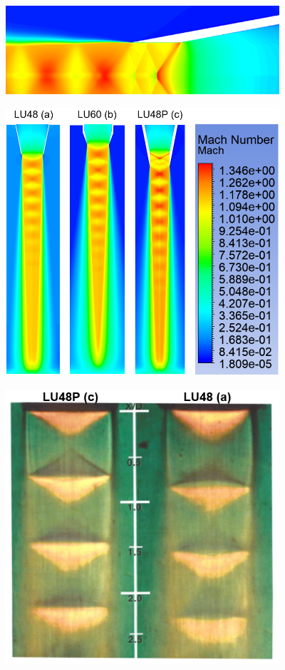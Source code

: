 \documentclass[12pt]{article} %
\begin{document}
\begin{center}
    \includegraphics[width=4in]{Mach_C_Fine.png}
    \label{fig:mach_C}
\end{center}

\begin{center}
    \includegraphics[width=4in]{NozzleCompare_Mach.PNG}
    \label{fig:NozzleComparison}
\end{center}

\begin{center}
    \includegraphics[width=4in]{VenaContracta_Real.PNG}
    \label{fig:VenaContractaReal}
\end{center}
\end{document}
